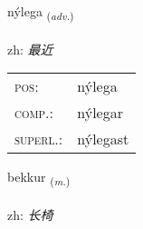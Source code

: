 \documentclass[frontgrid, backgrid]{flacards}\usepackage[]{graphicx}\usepackage[]{color}
\begin{document}
\renewcommand{\flhead}{\vskip5pt \fboxsep=0pt {\small\bfseries\footnotesize Atviksorð | 副词}}
\renewcommand{\fcfoot}{\vskip5pt \fboxsep=0pt \hspace{2pt}{\small\bfseries\footnotesize 2K}}

\renewcommand{\blhead}{\vskip5pt {\small\bfseries\footnotesize Atviksorð | 副词 }}
\renewcommand{\bcfoot}{\vskip5pt \hspace{2pt}{\small\bfseries\footnotesize 2K}}


{nýlega \small{\textsubscript{(\textit{adv.})}} \\[1ex] %
\textphonetic{[niːlɛɣa]} \\
zh: \emph{最近} \\  [2ex]
\renewcommand*{\arraystretch}{0.8}
\begin{tabular}{ll}
\textsc{pos}: & nýlega \\ 
\textsc{comp.}: & nýlegar \\ 
\textsc{superl.}: & nýlegast \\
\end{tabular}
}

\renewcommand{\flhead}{\vskip5pt \fboxsep=0pt {\small\bfseries\footnotesize Nafnorð | 名词}}
\renewcommand{\fcfoot}{\vskip5pt \fboxsep=0pt \hspace{2pt}{\small\bfseries\footnotesize 2K}}

\renewcommand{\blhead}{\vskip5pt {\small\bfseries\footnotesize Nafnorð | 名词 }}
\renewcommand{\bcfoot}{\vskip5pt \hspace{2pt}{\small\bfseries\footnotesize 2K}}


{bekkur \small{\textsubscript{(\textit{m.})}} \\[1ex] %
\textphonetic{[pɛhkʏr]} \\
zh: \emph{长椅} \\  [2ex]
\renewcommand*{\arraystretch}{0.8}
}
\end{document}
